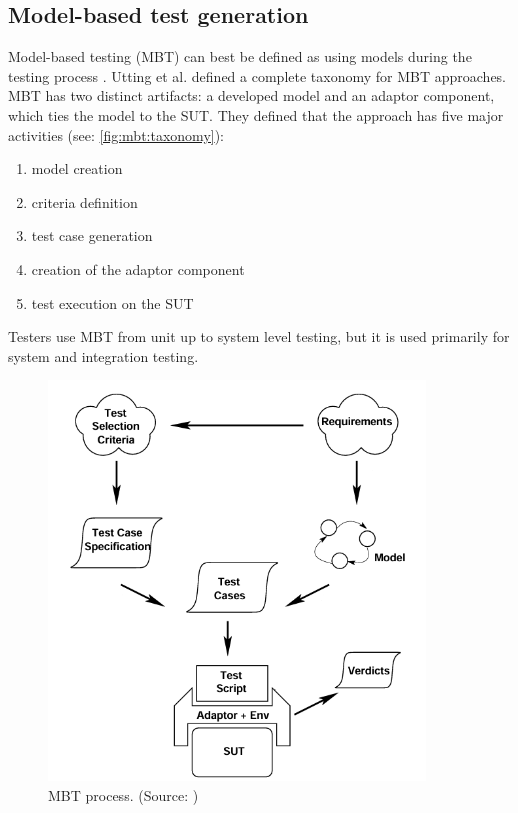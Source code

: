 \subsection{Model-based test generation}

Model-based testing (MBT) can best be defined as using models during the testing process \cite{cmbt:syllabus:2015}. Utting et al. \cite{utting2012taxonomy} defined a complete taxonomy for MBT approaches. MBT has two distinct artifacts: a developed model and an adaptor component, which ties the model to the SUT. They defined that the approach has five major activities (see: \autoref{fig:mbt:taxonomy}):
\begin{enumerate}
    \item model creation
    \item criteria definition
    \item test case generation
    \item creation of the adaptor component
    \item test execution on the SUT
\end{enumerate}
Testers use MBT from unit up to system level testing, but it is used primarily for system and integration testing.

\begin{figure}
    \centering
    \includegraphics[width=100mm, keepaspectratio]{figures/mbt-taxonomy_uttinger.png}
    \caption{MBT process. (Source: \cite{utting2012taxonomy})}
    \label{fig:mbt:taxonomy}
\end{figure}

